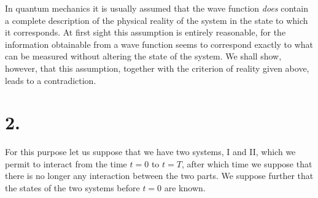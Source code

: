 In quantum mechanics it is usually assumed that the wave function
\emph{does} contain a complete description of the physical reality of
the system in the state to which it corresponds. At first sight this
assumption is entirely reasonable, for the information obtainable from a
wave function seems to correspond exactly to what can be measured
without altering the state of the system. We shall show, however, that
this assumption, together with the criterion of reality given above,
leads to a contradiction.

\section*{2.}

For this purpose let us suppose that we have two systems, I and II,
which we permit to interact from the time $t = 0$ to $t =
T$, after which time we suppose that there is no longer any
interaction between the two parts. We suppose further that the states of
the two systems before $t = 0$ are known.

